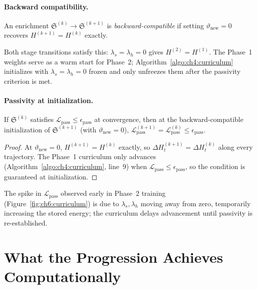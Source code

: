 \paragraph{Backward compatibility.}
\begin{definition}
\label{def:ch5:compat}
An enrichment $\mathfrak{S}^{(k)}\to\mathfrak{S}^{(k+1)}$ is
\emph{backward-compatible} if setting
$\vartheta_{\mathrm{new}} = 0$ recovers
$H^{(k+1)} = H^{(k)}$ exactly.
\end{definition}
Both stage transitions satisfy this:
$\lambda_s = \lambda_h = 0$ gives $H^{(2)} = H^{(1)}$.
The Phase~1 weights serve as a warm start for Phase~2;
Algorithm~\ref{algo:ch4:curriculum} initializes with $\lambda_s=\lambda_h=0$
frozen and only unfreezes them after the passivity criterion is met.

\paragraph{Passivity at initialization.}
\begin{proposition}
\label{prop:ch5:passivity}
If $\mathfrak{S}^{(k)}$ satisfies
$\mathcal{L}_{\mathrm{pass}} \leq \epsilon_{\mathrm{pass}}$
at convergence, then at the backward-compatible initialization of
$\mathfrak{S}^{(k+1)}$ (with $\vartheta_{\mathrm{new}} = 0$),
$\mathcal{L}_{\mathrm{pass}}^{(k+1)} = \mathcal{L}_{\mathrm{pass}}^{(k)}
\leq \epsilon_{\mathrm{pass}}$.
\end{proposition}
\begin{proof}
At $\vartheta_{\mathrm{new}} = 0$, $H^{(k+1)} = H^{(k)}$ exactly,
so $\Delta H^{(k+1)}_t = \Delta H^{(k)}_t$ along every trajectory.
The Phase~1 curriculum only advances (Algorithm~\ref{algo:ch4:curriculum},
line~9) when $\mathcal{L}_{\mathrm{pass}} \leq \epsilon_{\mathrm{pass}}$,
so the condition is guaranteed at initialization.
\end{proof}

The spike in $\mathcal{L}_{\mathrm{pass}}$ observed early in Phase~2
training (Figure~\ref{fig:ch6:curriculum}) is due to $\lambda_s,\lambda_h$
moving away from zero, temporarily increasing the stored energy;
the curriculum delays advancement until passivity is re-established.

\section{What the Progression Achieves Computationally}
\label{sec:ch5:compute}

